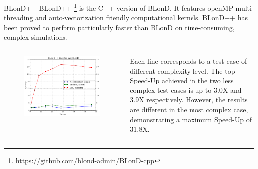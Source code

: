 \begin{frame}
	\begin{block}{BLonD++}
	BLonD++ \footnote{https://github.com/blond-admin/BLonD-cpp} is the C++ version of BLonD. It features openMP multi-threading and auto-vectorization friendly computational kernels. BLonD++ has been proved to perform particularly faster than BLonD on time-consuming, complex simulations.
	\end{block}

	\begin{block}{}
	
	\begin{columns}[t]
		\vspace{-1.4cm}
		\begin{figure}
			\includegraphics[width=\textwidth]{figures/BLonDpp-speedup2}
		\end{figure}
		
		Each line corresponds to a test-case of different complexity level. The top Speed-Up achieved in the two less complex test-cases is up to 3.0X and 3.9X respectively. However, the results are different in the most complex case, demonstrating a maximum Speed-Up of 31.8X. 
	\end{columns}
	\end{block}
\end{frame}

